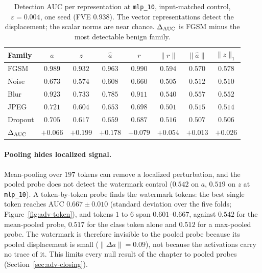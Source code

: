 \documentclass[../ppgc-tese.tex]{subfiles}
\begin{document}
\begin{table}[ht]
  \centering
  \caption{Detection AUC per representation at \texttt{mlp\_10}, input-matched
  control, $\varepsilon{=}0.004$, one seed (FVE $0.938$). The vector
  representations detect the displacement; the scalar norms are near chance.
  $\Delta_{\mathrm{AUC}}$ is FGSM minus the most detectable benign family.}
  \label{tab:adv-representations}
  \small
  \begin{tabular}{@{}lccccccc@{}}
    \toprule
    Family & $a$ & $z$ & $\hat{a}$ & $r$ & $\lVert r\rVert$ & $\lVert\hat{a}\rVert$ & $\lVert z\rVert_1$ \\
    \midrule
    FGSM & $0.989$ & $0.932$ & $0.963$ & $0.990$ & $0.594$ & $0.570$ & $0.578$ \\
    Noise & $0.673$ & $0.574$ & $0.608$ & $0.660$ & $0.505$ & $0.512$ & $0.510$ \\
    Blur & $0.923$ & $0.733$ & $0.785$ & $0.911$ & $0.540$ & $0.557$ & $0.552$ \\
    JPEG & $0.721$ & $0.604$ & $0.653$ & $0.698$ & $0.501$ & $0.515$ & $0.514$ \\
    Dropout & $0.705$ & $0.617$ & $0.659$ & $0.687$ & $0.516$ & $0.507$ & $0.506$ \\
    \midrule
    $\Delta_{\mathrm{AUC}}$ & $+0.066$ & $+0.199$ & $+0.178$ & $+0.079$ & $+0.054$ & $+0.013$ & $+0.026$ \\
    \bottomrule
  \end{tabular}
\end{table}

\paragraph*{Pooling hides localized signal.}
Mean-pooling over $197$ tokens can remove a localized perturbation, and the
pooled probe does not detect the watermark control ($0.542$ on $a$, $0.519$ on
$z$ at \texttt{mlp\_10}). A token-by-token probe finds the watermark tokens:
the best single token reaches AUC $0.667\pm0.010$ (standard deviation over the
five folds; Figure~\ref{fig:adv-token}), and tokens $1$ to $6$ span
$0.601$--$0.667$, against $0.542$ for the mean-pooled probe, $0.517$ for the
class token alone and $0.512$ for a max-pooled probe.
The watermark is therefore invisible to the pooled probe because its pooled
displacement is small ($\lVert\Delta a\rVert=0.09$), not because the
activations carry no trace of it. This limits every null result of the chapter
to pooled probes (Section~\ref{sec:adv-closing}).
\end{document}
